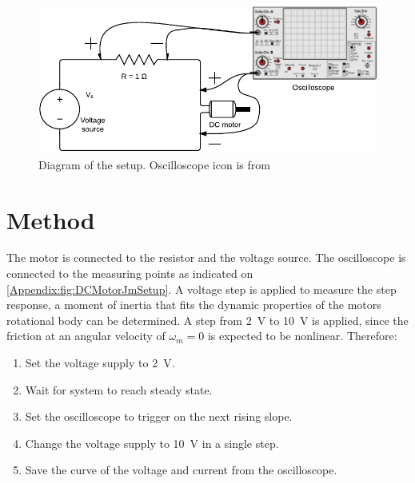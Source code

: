 \begin{figure} [h]
    \centering
        \includegraphics[width=\textwidth]{figures/test/DCTestJ}
        \caption{Diagram of the setup. Oscilloscope icon is from \cite{web:OscilloscopeIcon}}
        \label{Appendix:fig:DCMotorJmSetup}
\end{figure}


\section*{Method}
The motor is connected to the resistor and the voltage source. The oscilloscope is connected to the measuring points as indicated on \autoref{Appendix:fig:DCMotorJmSetup}. A voltage step is applied to measure the step response, a moment of inertia that fits the dynamic properties of the motors rotational body can be determined. A step from \SI{2}{\volt} to \SI{10}{\volt} is applied, since the friction at an angular velocity of $\omega_m = 0$ is expected to be nonlinear. Therefore:
\begin{enumerate}
\item Set the voltage supply to \SI{2}{\volt}.
\item Wait for system to reach steady state.
\item Set the oscilloscope to trigger on the next rising slope.
\item Change the voltage supply to \SI{10}{\volt} in a single step.
\item Save the curve of the voltage and current from the oscilloscope.
\end{enumerate}

